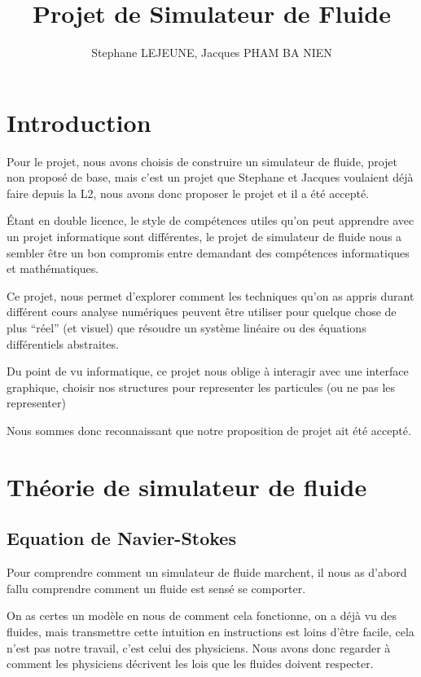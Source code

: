 \documentclass{article}
\author{Stephane LEJEUNE, Jacques PHAM BA NIEN} %
\title{Projet de Simulateur de Fluide}
\begin{document}
\maketitle
\newpage
\tableofcontents
\newpage

\section{Introduction}

Pour le projet, nous avons choisis de construire un simulateur de fluide, projet non proposé de base, mais c'est un projet que Stephane et Jacques voulaient déjà faire depuis la L2, nous avons donc proposer le projet et il a été accepté.

Étant en double licence, le style de compétences utiles qu'on peut apprendre avec un projet informatique sont différentes, le projet de simulateur de fluide nous a sembler être un bon compromis entre demandant des compétences informatiques et mathématiques. 

Ce projet, nous permet d'explorer comment les techniques qu'on as appris durant différent cours analyse numériques peuvent être utiliser pour quelque chose de plus ``réel'' (et visuel) que résoudre un système linéaire ou des équations différentiels abstraites.

Du point de vu informatique, ce projet nous oblige à interagir avec une interface graphique, choisir nos structures pour representer les particules (ou ne pas les representer)

Nous sommes donc reconnaissant que notre proposition de projet ait été accepté.

\section{Théorie de simulateur de fluide}
\subsection{Equation de Navier-Stokes}
Pour comprendre comment un simulateur de fluide marchent, il nous as d'abord fallu comprendre comment un fluide est sensé se comporter.

On as certes un modèle en nous de comment cela fonctionne, on a déjà vu des fluides, mais transmettre cette intuition en instructions est loins d'être facile, cela n'est pas notre travail, c'est celui des physiciens. Nous avons donc regarder à comment les physiciens décrivent les lois que les fluides doivent respecter.
\end{document}
